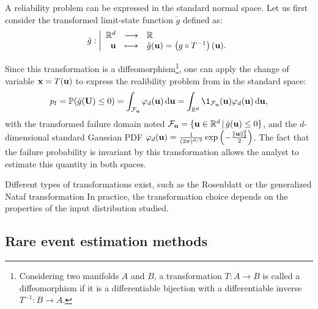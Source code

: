 A reliability problem can be expressed in the standard normal space. 
Let us first consider the transformed limit-state function $\check{g}$ defined as: 
\begin{equation}
    \check{g} : \bigg|
    \begin{array}{rcl}
        \mathbb{R}^d & \longrightarrow & \mathbb{R}\\
        {\bf u} & \longmapsto & \check{g}({\bf u}) = \left(g \circ T^{-1}\right)({\bf u}).
    \end{array}
\end{equation}

Since this transformation is a diffeomorphism\footnote{Considering two manifolds $A$ and $B$, a transformation $T: A \rightarrow B$ is called a diffeomorphism if it is a differentiable bijection with a differentiable inverse $T^{-1} : B \rightarrow A$.}, 
one can apply the change of variable ${\bf x} = T({\bf u})$ to express the realibility problem from  in the standard space: 
\begin{equation}
    \pf = \P(\cg(\bU) \leq 0) 
        = \int_{\iF_\bu} \varphi_d(\bu) \, \dd\bu 
        = \int_{\R^d} \1_{\iF_\bu}(\bu) \varphi_d(\bu) \, \dd\bu,
\end{equation}
with the transformed failure domain noted $\mathcal{F}_{\bf u} = \{{\bf u} \in \mathbb{R}^d \, | \, \check{g}({\bf u}) \leq 0\}$, 
and the $d$-dimensional standard Gaussian PDF $\varphi_d({\bf u}) = \frac{1}{(2\pi)^{d/2}} \exp\left(-\frac{\lVert{\bf u}\rVert^2_2}{2}\right)$. 
The fact that the failure probability is invariant by this transformation allows the analyst to estimate this quantity in both spaces.  

Different types of transformations exist, such as the Rosenblatt or the generalized Nataf transformation \citep{Lebrun_PHD_2013}
In practice, the transformation choice depends on the properties of the input distribution studied. 



\subsection{Rare event estimation methods}


